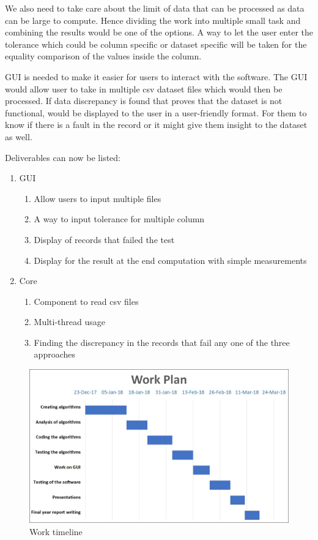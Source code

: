 We also need to take care about the limit of data that can be processed as data can be large to compute. Hence dividing the work into multiple small task and combining the results would be one of the options. A way to let the user enter the tolerance which could be column specific or dataset specific will be taken for the equality comparison of the values inside the column.

GUI is needed to make it easier for users to interact with the software. The GUI would allow user to take in multiple csv dataset files which would then be processed. If data discrepancy is found that proves that the dataset is not functional, would be displayed to the user in a user-friendly format. For them to know if there is a fault in the record or it might give them insight to the dataset as well.

Deliverables can now be listed:
\begin{enumerate}
    \item GUI
    \begin{enumerate}
        \item Allow users to input multiple files
        \item A way to input tolerance for multiple column
        \item Display of records that failed the test
        \item Display for the result at the end computation with simple measurements
    \end{enumerate}
    \item Core
    \begin{enumerate}
        \item Component to read csv files
        \item Multi-thread usage
        \item Finding the discrepancy in the records that fail any one of the three approaches
    \end{enumerate}
\end{enumerate}

\begin{figure}[ht]
    \centering
    \includegraphics[width=400pt]{gantchart}
    \caption{\label{fig:gantchart} Work timeline}    
\end{figure}

